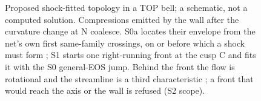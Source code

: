 \begin{figure}[htbp]
\caption{Proposed shock-fitted topology in a TOP bell; a schematic, not a computed solution. Compressions emitted by the wall after the curvature change at N coalesce. S0a locates their envelope from the net's own first same-family crossings, on or before which a shock must form \citep{courant1944}; S1 starts one right-running front at the cusp C and fits it with the S0 general-EOS jump. Behind the front the flow is rotational and the streamline is a third characteristic \citep{shyne1988}; a front that would reach the axis or the wall is refused (S2 scope).}
\label{fig:shock_topology}
\end{figure}
